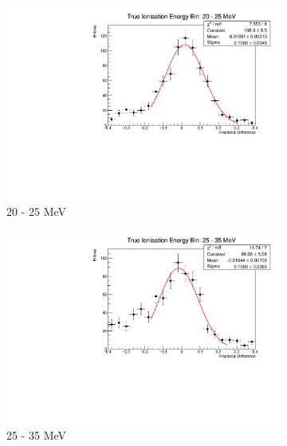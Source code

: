 \begin{figure}
\begin{subfigure}[b]{0.49\textwidth}
		\includegraphics[width=\textwidth]{figures/ion_res_20.pdf}
		\caption {20 - 25 MeV}
	\end{subfigure}
	\hfill
	\begin{subfigure}[b]{0.49\textwidth}
		\centering
		\vspace{5mm}
		\includegraphics[width=\textwidth]{figures/ion_res_25.pdf}
		\caption {25 - 35 MeV}
		\label{fig:ion_fit_25}
	\end{subfigure}
	\begin{subfigure}[b]{0.49\textwidth}
		\centering
		\vspace{5mm}

\end{subfigure}
\end{figure}
